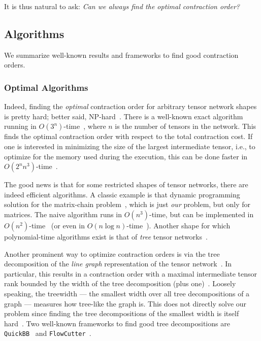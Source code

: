 It is thus natural to ask: \emph{Can we always find the optimal contraction order?}

\subsection{Algorithms}

We summarize well-known results and frameworks to find good contraction orders.

\subsubsection{Optimal Algorithms}

Indeed, finding the \emph{optimal} contraction order for arbitrary tensor network shapes is pretty hard; better said, NP-hard~\cite{ordering_np_hard}. There is a well-known exact algorithm running in $O(3^n)$-time~\cite{ordering_exact_algo}, where $n$ is the number of tensors in the network. This finds the optimal contraction order with respect to the total contraction cost. If one is interested in minimizing the size of the largest intermediate tensor, i.e., to optimize for the memory used during the execution, this can be done faster in $O(2^n n^3)$-time~\cite{dpconv}. 

The good news is that for some restricted shapes of tensor networks, there are indeed efficient algorithms. A classic example is that dynamic programming solution for the matrix-chain problem~\cite{cormen}, which is just \emph{our} problem, but only for matrices. The naive algorithm runs in $O(n^3)$-time, but can be implemented in $O(n^2)$-time~\cite{mc_yao} (or even in $O(n \log n)$-time~\cite{mc_nlogn_1, mc_nlogn_2}). Another shape for which polynomial-time algorithms exist is that of \emph{tree} tensor networks~\cite{ttn_size, ttn_cost}.

Another prominent way to optimize contraction orders is via the tree decomposition of the \emph{line graph} representation of the tensor network~\cite{markov_shi, dudek_tree_decomp, roman_tree_decomp}. In particular, this results in a contraction order with a maximal intermediate tensor rank bounded by the width of the tree decomposition (plus one)~\cite{markov_shi}. Loosely speaking, the treewidth --- the smallest width over all tree decompositions of a graph --- measures how tree-like the graph is. This does not directly solve our problem since finding the tree decompositions of the smallest width is itself hard~\cite{treewidth_approx}. Two well-known frameworks to find good tree decompositions are \texttt{QuickBB}~\cite{quick_bb} and \texttt{FlowCutter}~\cite{flow_cutter_1, flow_cutter_2}.

